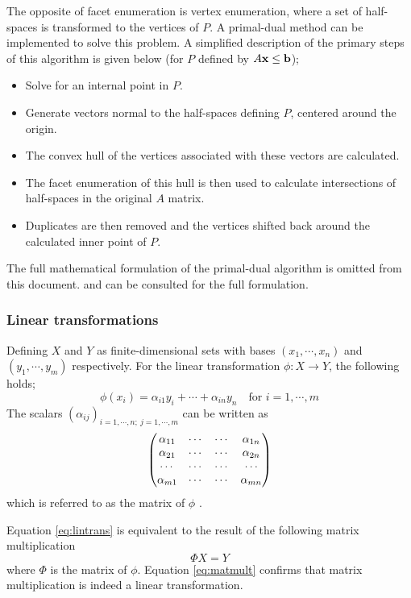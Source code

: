 The opposite of facet enumeration is vertex enumeration, where a set of half-spaces is transformed to the vertices of $P$.
A primal-dual method can be implemented to solve this problem.
A simplified description of the primary steps of this algorithm is given below (for $P$ defined by $A{\bf {x}}\leq{\bf {b}}$);
\begin{itemize}
\item Solve for an internal point in $P$.
\item Generate vectors normal to the half-spaces defining $P$, centered around the origin.
\item The convex hull of the vertices associated with these vectors are calculated.
\item The facet enumeration of this hull is then used to calculate intersections of half-spaces in the original $A$ matrix.
\item Duplicates are then removed and the vertices shifted back around the calculated inner point of $P$.
\end{itemize}
The full mathematical formulation of the primal-dual algorithm is omitted from this document.
\citet[636-639]{primaldual1} and \citet{primaldual2} can be consulted for the full formulation. 

\subsubsection{Linear transformations}
Defining $X$ and $Y$ as finite-dimensional sets with bases $(x_1,\cdots,x_n)$ and $(y_1,\cdots,y_m)$ respectively.
For the linear transformation $\phi : X \to Y$, the following holds;
\begin{equation}
  \label{eq:lintrans}
  \phi(x_i) = \alpha_{i1}y_i+\cdots+\alpha_{in}y_n \text{~~~for~} i = 1, \cdots, m
\end{equation}
The scalars $(\alpha_{ij})_{i=1,\cdots,n;~j=1,\cdots,m}$ can be written as
\begin{equation}
  \begin{pmatrix}
    \alpha_{11} &\cdots &\cdots &\alpha_{1n} \\
    \alpha_{21} &\cdots &\cdots &\alpha_{2n} \\
    \cdots     &\cdots &\cdots &\cdots \\
    \alpha_{m1} &\cdots &\cdots &\alpha_{mn} \\
  \end{pmatrix} \notag
\end{equation}
which is referred to as the matrix of $\phi$ \citep[48-49,~166]{leung}.

Equation \ref{eq:lintrans} is equivalent to the result of the following matrix multiplication
\begin{equation}
  \label{eq:matmult}
  \Phi X = Y
\end{equation}
where $\Phi$ is the matrix of $\phi$.
Equation \ref{eq:matmult} confirms that matrix multiplication is indeed a linear transformation.

